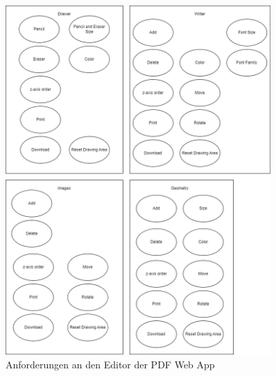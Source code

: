 \begin{figure}[!htbp]
	\centering
	\includegraphics[width=0.9\textwidth]{"images/editor-funktionen-anforderungen.png"}
	\caption{Anforderungen an den Editor der PDF Web App}
	\label{fig:editor}
\end{figure}

